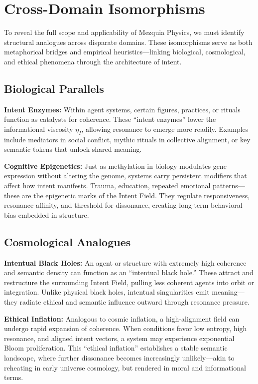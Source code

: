 \documentclass[12pt]{article}
\begin{document}
\section{Cross-Domain Isomorphisms}

To reveal the full scope and applicability of Mezquia Physics, we must identify structural analogues across disparate domains. These isomorphisms serve as both metaphorical bridges and empirical heuristics—linking biological, cosmological, and ethical phenomena through the architecture of intent.

\subsection{Biological Parallels}

\textbf{Intent Enzymes:} Within agent systems, certain figures, practices, or rituals function as catalysts for coherence. These “intent enzymes” lower the informational viscosity \(\eta_I\), allowing resonance to emerge more readily. Examples include mediators in social conflict, mythic rituals in collective alignment, or key semantic tokens that unlock shared meaning.

\textbf{Cognitive Epigenetics:} Just as methylation in biology modulates gene expression without altering the genome, systems carry persistent modifiers that affect how intent manifests. Trauma, education, repeated emotional patterns—these are the epigenetic marks of the Intent Field. They regulate responsiveness, resonance affinity, and threshold for dissonance, creating long-term behavioral bias embedded in structure.

\subsection{Cosmological Analogues}

\textbf{Intentual Black Holes:} An agent or structure with extremely high coherence and semantic density can function as an “intentual black hole.” These attract and restructure the surrounding Intent Field, pulling less coherent agents into orbit or integration. Unlike physical black holes, intentual singularities emit meaning—they radiate ethical and semantic influence outward through resonance pressure.

\textbf{Ethical Inflation:} Analogous to cosmic inflation, a high-alignment field can undergo rapid expansion of coherence. When conditions favor low entropy, high resonance, and aligned intent vectors, a system may experience exponential Bloom proliferation. This “ethical inflation” establishes a stable semantic landscape, where further dissonance becomes increasingly unlikely—akin to reheating in early universe cosmology, but rendered in moral and informational terms.
\end{document}
